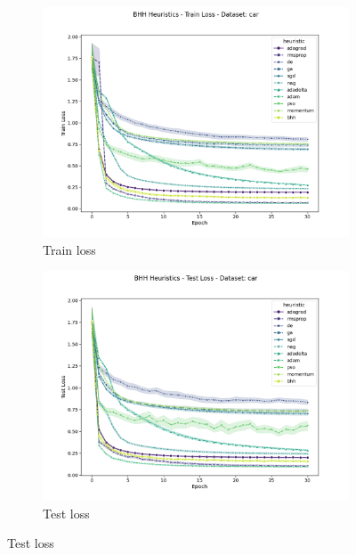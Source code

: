 \begin{figure}[htbp]
	\begin{subfigure}{0.5\textwidth}
    	\centering
        \includegraphics[width=\textwidth]{analysis/standalone/figures/train/loss/car.png}
        \caption{Train loss}
        \label{fig:results:standalone:figures:loss:train:car}
	\end{subfigure}
	\begin{subfigure}{0.5\textwidth}
    	\centering
        \includegraphics[width=\textwidth]{analysis/standalone/figures/test/loss/car.png}
        \caption{Test loss}
        \label{fig:results:standalone:figures:loss:test:car}
	\end{subfigure}
	\par\bigskip

\end{figure}
